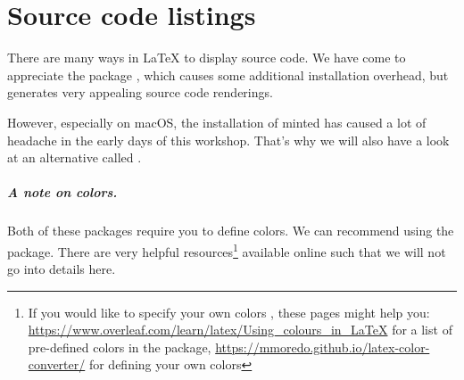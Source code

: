 \chapter{Source code listings}
\label{sec:source-code-listings}

There are many ways in \LaTeX{} to display source code.
We have come to appreciate the package , which causes some additional installation overhead, but generates very appealing source code renderings.

However, especially on macOS, the installation of minted has caused a lot of headache in the early days of this workshop.
That's why we will also have a look at an alternative called .

\paragraph{A note on colors.} Both of these packages require you to define colors. 
We can recommend using the  package.
There are very helpful resources\footnote{If you would like to specify your own colors , these pages might help you: \url{https://www.overleaf.com/learn/latex/Using_colours_in_LaTeX} for a list of pre-defined colors in the  package, \url{https://mmoredo.github.io/latex-color-converter/} for defining your own colors} available online such that we will not go into details here.



